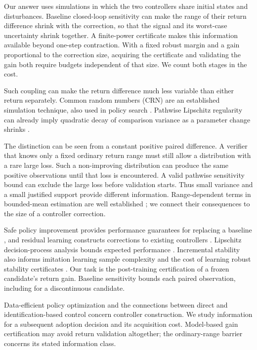 \documentclass[twocolumn,nameyear]{autart}
\begin{document}
Our answer uses simulations in which the two controllers share initial
states and disturbances. Baseline closed-loop sensitivity can make the
range of their return difference shrink with the correction, so that
the signal and its worst-case uncertainty shrink together. A finite-power
certificate makes this information available beyond one-step contraction.
With a fixed robust margin and a gain proportional to the correction
size, acquiring the certificate and validating the gain both require
budgets independent of that size. We count both stages in the cost.

Such coupling can make the return difference much less variable than
either return separately. Common random numbers (CRN) are an
established simulation technique, also used in policy search
\citep{glasserman1992guidelines,ng2000pegasus,strens2002paired}.
Pathwise Lipschitz regularity can already imply quadratic decay of
comparison variance as a parameter change shrinks
\citep[Lemma 6.1]{glasserman1992guidelines}.

The distinction can be seen from a constant positive paired difference.
A verifier that knows only a fixed ordinary return range must still
allow a distribution with a rare large loss. Such a non-improving
distribution can produce the same positive observations until that
loss is encountered. A valid pathwise sensitivity bound can exclude the
large loss before validation starts. Thus small variance and a small
justified support provide different information. Range-dependent terms
in bounded-mean estimation are well established
\citep{mnih2008stopping,waudbysmith2024betting}; we connect their
consequences to the size of a controller correction.

Safe policy improvement provides performance guarantees for replacing
a baseline \citep{pirotta2013safe,thomas2015high}, and residual learning
constructs corrections to existing controllers
\citep{johannink2018residual}. Lipschitz decision-process analysis bounds
expected performance \citep{pirotta2015lipschitz,asadi2018lipschitz}.
Incremental stability \citep{angeli2002incremental} also informs imitation
learning sample complexity \citep{tu2022sample} and the cost of learning
robust stability certificates \citep{zhang2022adversarial}.
Our task is the post-training certification of a frozen candidate's
return gain. Baseline sensitivity bounds each paired observation,
including for a discontinuous candidate.

Data-efficient policy optimization \citep{zhao2025dataenabled} and the
connections between direct and identification-based control
\citep{dorfler2023bridging} concern controller construction.
We study information for a subsequent adoption decision and its
acquisition cost. Model-based gain certification may avoid return
validation altogether; the ordinary-range barrier concerns its stated
information class.
\end{document}
